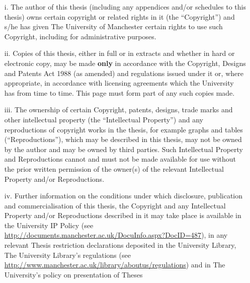 
{
	
	\begin{enumerate}
		\setlength{\itemsep}{-2pt}%
	
		\item[i.]  The author of this thesis (including any appendices and/or
		schedules to this thesis) owns certain copyright or related rights in it
		(the ``Copyright'') and s/he has given The University of Manchester certain
		rights to use such Copyright, including for administrative purposes.
		
		\item[ii.] Copies of this thesis, either in full or in extracts and whether
		in hard or electronic copy, may be made \textbf{only} in accordance with
		the Copyright, Designs and Patents Act 1988 (as amended) and regulations
		issued under it or, where appropriate, in accordance with licensing
		agreements which the University has from time to time. This page must form
		part of any such copies made.
		
		\item[iii.] The ownership of certain Copyright, patents, designs, trade
		marks and other intellectual property (the ``Intellectual Property'') and
		any reproductions of copyright works in the thesis, for example graphs and
		tables (``Reproductions''), which may be described in this thesis, may not
		be owned by the author and may be owned by third parties. Such Intellectual
		Property and Reproductions cannot and must not be made available for use
		without the prior written permission of the owner(s) of the relevant
		Intellectual Property and/or Reproductions.
		
		\item[iv.] Further information on the conditions under which disclosure,
		publication and commercialisation of this thesis, the Copyright and any
		Intellectual Property and/or Reproductions described in it may take place
		is available in the University IP Policy (see
		\url{http://documents.manchester.ac.uk/DocuInfo.aspx?DocID=487}), in any
		relevant Thesis restriction declarations deposited in the University
		Library, The University Library's regulations (see
		\url{http://www.manchester.ac.uk/library/aboutus/regulations}) and in The
		University's policy on presentation of Theses
	
	\end{enumerate}
}
